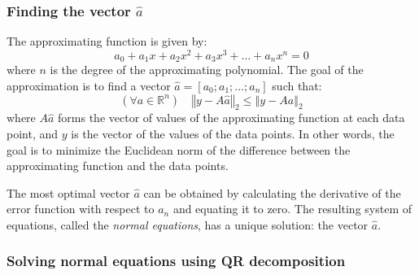 \documentclass{article}
\begin{document}
	\subsubsection{Finding the vector $\widehat{a}$}
	
	The approximating function is given by:
	\begin{equation}
		a_0 + a_1x + a_2x^2 + a_3x^3 + \ldots + a_nx^n = 0
	\end{equation}
	where $n$ is the degree of the approximating polynomial. The goal of the
	approximation is to find a vector $\widehat{a} = [ a_0; a_1; \ldots;
	a_n ]$ such that:
	\begin{equation}
		(\forall{a \in \mathbb{R}^n})\quad
		\left\Vert y - A\widehat{a} \right\Vert_2 \leq
		\left\Vert y - Aa \right\Vert_2
	\end{equation}
	where $A\widehat{a}$ forms the vector of values of the approximating
	function at each data point, and $y$ is the vector of the values of the
	data points. In other words, the goal is to minimize the Euclidean norm
	of the difference between the approximating function and the data
	points.
	
	The most optimal vector $\widehat{a}$ can be obtained by calculating the
	derivative of the error function with respect to $a_n$ and equating it
	to zero. The resulting system of equations, called the
	\textit{normal equations}, has a unique solution: the vector
	$\widehat{a}$.
	
	\subsubsection{Solving normal equations using QR decomposition}
	
\end{document}
